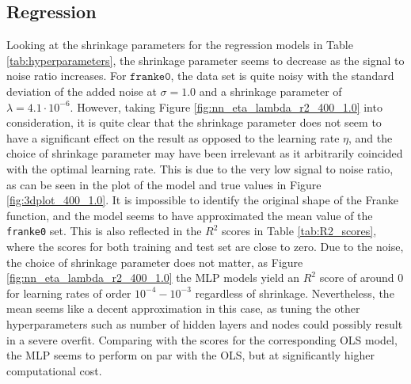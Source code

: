 \documentclass[a4paper, 11pt, twocolumn]{article}
\begin{document}
\subsection{Regression}
Looking at the shrinkage parameters for the regression models in Table
\ref{tab:hyperparameters}, the shrinkage parameter seems to decrease as the
signal to noise ratio increases. For $\texttt{franke0}$, the data set is quite
noisy with the standard deviation of the added noise at $\sigma=1.0$ and a
shrinkage parameter of $\lambda=4.1\cdot 10^{-6}$. However, taking Figure
\ref{fig:nn_eta_lambda_r2_400_1.0} into consideration, it is quite clear that the
shrinkage parameter does not seem to have a significant effect on the result as
opposed to the learning rate $\eta$, and the choice of shrinkage parameter may
have been irrelevant as it arbitrarily coincided with the optimal learning rate.
This is due to the very low signal to noise ratio, as can be seen in the plot of
the model and true values in Figure \ref{fig:3dplot_400_1.0}. It is impossible to
identify the original shape of the Franke function, and the model seems to have
approximated the mean value of the \texttt{franke0} set. This is also reflected
in the $R^2$ scores in Table \ref{tab:R2_scores}, where the scores for both
training and test set are close to zero. Due to the noise, the choice of
shrinkage parameter does not matter, as Figure \ref{fig:nn_eta_lambda_r2_400_1.0}
the MLP models yield an $R^2$ score of around 0 for learning rates of order
$10^{-4}-10^{-3}$ regardless of shrinkage. Nevertheless, the mean seems like a
decent approximation in this case, as tuning the other hyperparameters such as
number of hidden layers and nodes could possibly result in a severe overfit.
Comparing with the scores for the corresponding OLS model, the MLP seems to
perform on par with the OLS, but at significantly higher computational cost.
\end{document}
